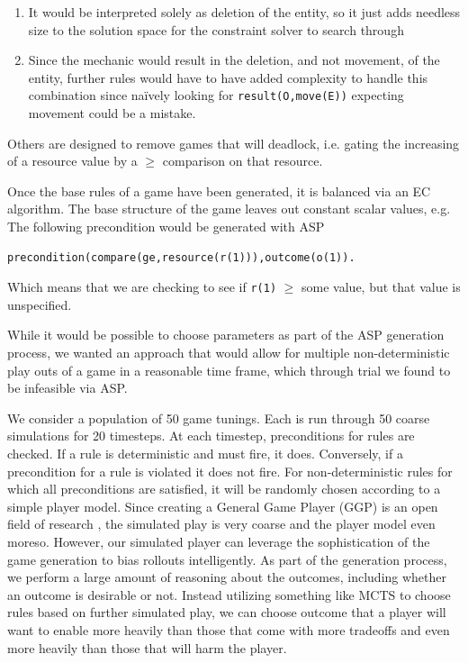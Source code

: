 \documentclass[a4paper]{article}
\begin{document}
\begin{enumerate}
\item It would be interpreted solely as deletion of the entity, so it just adds needless size to the solution space for the constraint solver to search through
\item Since the mechanic would result in the deletion, and not movement, of the entity, further rules would have to have added complexity to handle this combination since na\"ively looking for \texttt{result(O,move(E))} expecting movement could be a mistake.
\end{enumerate}

Others are designed to remove games that will deadlock, i.e. gating the increasing of a resource value by a $\ge$ comparison on that resource.  

Once the base rules of a game have been generated, it is balanced via an EC algorithm. The base structure of the game leaves out constant scalar values, e.g.  The following precondition would be generated with ASP


\begin{verbatim} 
precondition(compare(ge,resource(r(1))),outcome(o(1)).
\end{verbatim}
   
Which means that we are checking to see if \texttt{r(1)} $\ge$ some value, but that value is unspecified.

While it would be possible to choose parameters as part of the ASP generation process, we wanted an approach that would allow for multiple non-deterministic play outs of a game in a reasonable time frame, which through trial we found to be infeasible via ASP. 

We consider a population of 50 game tunings.  Each is run through 50 coarse simulations for 20 timesteps.  At each timestep, preconditions for rules are checked.  If a rule is deterministic and must fire, it does.  Conversely, if a precondition for a rule is violated it does not fire.  For non-deterministic rules for which all preconditions are satisfied, it will be randomly chosen according to a simple player model.  Since creating a General Game Player (GGP) is an open field of research \cite{GGPSTUFF}, the simulated play is very coarse and the player model even moreso.  However, our simulated player can leverage the sophistication of the game generation to bias rollouts intelligently.  As part of the generation process, we perform a large amount of reasoning about the outcomes, including whether an outcome is desirable or not.  Instead utilizing  something like MCTS to choose rules based on further simulated play, we can choose outcome that a player will want to enable more heavily than those that come with more tradeoffs and even more heavily than those that will harm the player.  
\end{document}
